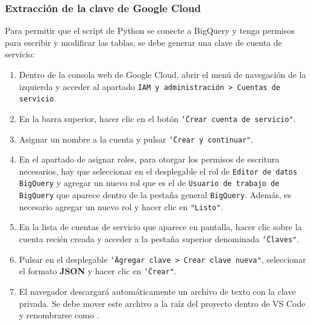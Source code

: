 \subsubsection{Extracción de la clave de Google Cloud}
Para permitir que el script de Python se conecte a BigQuery y tenga permisos para escribir y modificar las tablas, se debe generar una clave de cuenta de servicio:
\begin{enumerate}
    \item Dentro de la consola web de Google Cloud, abrir el menú de navegación de la izquierda y acceder al apartado \texttt{IAM y administración > Cuentas de servicio}.
    \item En la barra superior, hacer clic en el botón \texttt{\char`\"Crear cuenta de servicio"}.
    \item Asignar un nombre a la cuenta y pulsar \texttt{\char`\"Crear y continuar"}.
    \item En el apartado de asignar roles, para otorgar los permisos de escritura necesarios, hay que seleccionar en el desplegable el rol de \texttt{Editor de datos BigQuery} y agregar un nuevo rol que es el de \texttt{Usuario de trabajo de BigQuery} que aparece dentro de la pestaña general \texttt{BigQuery}. Además, es necesario agregar un nuevo rol y hacer clic en \texttt{"Listo"}.
    \item En la lista de cuentas de servicio que aparece en pantalla, hacer clic sobre la cuenta recién creada y acceder a la pestaña superior denominada \texttt{\char`\"Claves"}.
    \item Pulsar en el desplegable \texttt{\char`\"Agregar clave > Crear clave nueva"}, seleccionar el formato \textbf{JSON} y hacer clic en \texttt{\char`\"Crear"}.
    \item El navegador descargará automáticamente un archivo de texto con la clave privada. Se debe mover este archivo a la raíz del proyecto dentro de VS Code y renombrarse como .
\end{enumerate}

